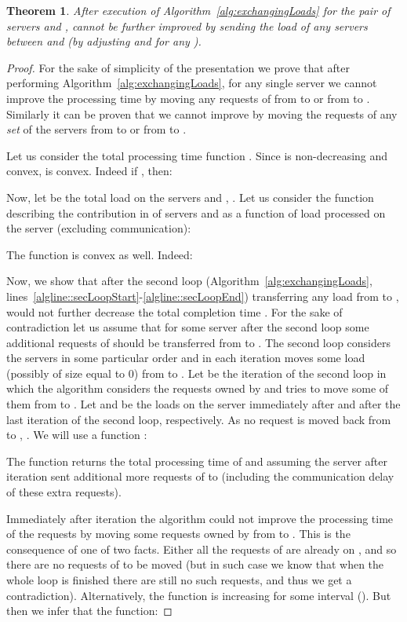 \documentclass[11pt]{article}
\newtheorem{theorem}{Theorem}
\begin{document}
\begin{theorem}\label{lemma::delegationOptimality}
After execution of Algorithm~\ref{alg:exchangingLoads} for the pair of servers  and ,  cannot be further improved by sending the load of any servers between  and  (by adjusting  and  for any ).
\end{theorem}
\begin{proof}
For the sake of simplicity of the presentation we prove that after performing Algorithm~\ref{alg:exchangingLoads}, for any single server  we cannot improve the processing time  by moving any requests of  from  to  or from  to . Similarly it can be proven that we cannot improve  by moving the requests of any \emph{set} of the servers from  to  or from  to .

Let us consider the total processing time function . Since  is non-decreasing and convex,  is convex. Indeed if , then:

Now, let  be the total load on the servers  and , . Let us consider the function  describing the contribution in  of servers  and  as a function of load  processed on the server  (excluding communication): 

The function  is convex as well. Indeed:


Now, we show that after the second loop (Algorithm~\ref{alg:exchangingLoads}, lines~\ref{algline::secLoopStart}-\ref{algline::secLoopEnd}) transferring any load from  to , would not further decrease the total completion time . 
For the sake of contradiction let us assume that for some server  after the second loop some additional requests of  should be transferred from  to .
The second loop considers the servers in some particular order and in each iteration moves some load (possibly of size equal to 0) from  to .
Let  be the iteration of the second loop in which the algorithm considers the requests owned by  and tries to move some of them from  to .
Let  and  be the loads on the server  immediately after  and after the last iteration of the second loop, respectively.
As no request is moved back from  to , .
We will use a function :

The function  returns the total processing time of  and  assuming the server  after iteration  sent additional  more requests of  to  (including the communication delay of these extra  requests).

Immediately after iteration  the algorithm could not improve the processing time of the requests by moving some requests owned by  from  to . This is the consequence of one of two facts. Either all the requests of  are already on , and so there are no requests of  to be moved (but in such case we know that when the whole loop is finished there are still no such requests, and thus we get a contradiction). Alternatively, the function  is increasing for some interval  (). But then we infer that the function:


\end{proof}
\end{document}
